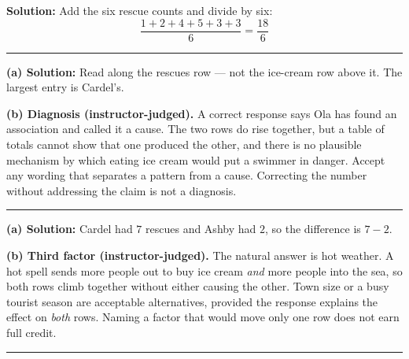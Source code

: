 \documentclass[12pt]{article}
\begin{document}



\textbf{Solution:} \quad Add the six rescue counts and divide by six:
\[ \frac{1 + 2 + 4 + 5 + 3 + 3}{6} = \frac{18}{6} \]

\vspace{0.2cm}

\noindent\rule{\linewidth}{0.2pt}


\textbf{(a) Solution:} \quad Read along the rescues row --- not the ice-cream row above it. The
largest entry is Cardel's. 

\textbf{(b) Diagnosis (instructor-judged).} A correct response says Ola has found an association
and called it a cause. The two rows do rise together, but a table of totals cannot show that one
produced the other, and there is no plausible mechanism by which eating ice cream would put a
swimmer in danger. Accept any wording that separates a pattern from a cause. Correcting the number
without addressing the claim is not a diagnosis.

\vspace{0.2cm}

\noindent\rule{\linewidth}{0.2pt}


\textbf{(a) Solution:} \quad Cardel had $7$ rescues and Ashby had $2$, so the difference is
$7 - 2$. 

\textbf{(b) Third factor (instructor-judged).} The natural answer is hot weather. A hot spell
sends more people out to buy ice cream \textit{and} more people into the sea, so both rows climb
together without either causing the other. Town size or a busy tourist season are acceptable
alternatives, provided the response explains the effect on \textit{both} rows. Naming a factor
that would move only one row does not earn full credit.

\vspace{0.2cm}

\noindent\rule{\linewidth}{0.2pt}

\end{document}
